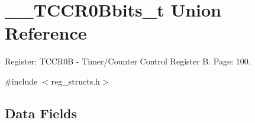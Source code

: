 \hypertarget{union_____t_c_c_r0_bbits__t}{\section{\+\_\+\+\_\+\+T\+C\+C\+R0\+Bbits\+\_\+t Union Reference}
\label{union_____t_c_c_r0_bbits__t}
}


Register\+: T\+C\+C\+R0\+B -\/ Timer/\+Counter Control Register B. Page\+: 100.  




{\ttfamily \#include $<$reg\+\_\+structs.\+h$>$}

\subsection*{Data Fields}
